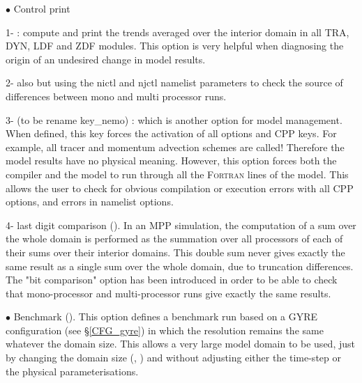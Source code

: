  
 
$\bullet$ Control print %

1-  : compute and print the trends averaged over the interior domain 
in all TRA, DYN, LDF and ZDF modules. This option is very helpful when 
diagnosing the origin of an undesired change in model results. 

2- also  but using the nictl and njctl namelist parameters to check 
the source of differences between mono and multi processor runs.

3-  (to be rename key\_nemo) : which is another option for model 
management. When defined, this key forces the activation of all options and 
CPP keys. For example, all tracer and momentum advection schemes are called! 
Therefore the model results have no physical meaning. 
However, this option forces both the compiler and the model to run through 
all the \textsc{Fortran} lines of the model. This allows the user to check for obvious 
compilation or execution errors with all CPP options, and errors in namelist options.

4- last digit comparison (). In an MPP simulation, the computation of 
a sum over the whole domain is performed as the summation over all processors of 
each of their sums over their interior domains. This double sum never gives exactly 
the same result as a single sum over the whole domain, due to truncation differences. 
The "bit comparison" option has been introduced in order to be able to check that 
mono-processor and multi-processor runs give exactly the same results. 

$\bullet$  Benchmark (). This option defines a benchmark run based on 
a GYRE configuration (see \S\ref{CFG_gyre}) in which the resolution remains the same 
whatever the domain size. This allows a very large model domain to be used, just by 
changing the domain size (, ) and without adjusting either the time-step 
or the physical parameterisations. 


